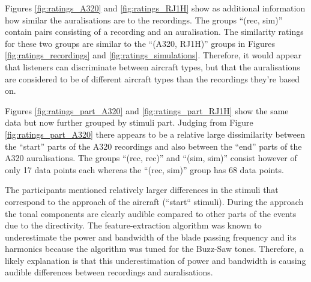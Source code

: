 
Figures \ref{fig:ratings_A320} and \ref{fig:ratings_RJ1H} show
as additional information how similar the auralisations are to the recordings.
The groups ``(rec, sim)'' contain pairs consisting of a recording and an
auralisation. The similarity ratings for these two groups are similar to the
``(A320, RJ1H)'' groups in Figures \ref{fig:ratings_recordings} and
\ref{fig:ratings_simulations}. Therefore, it would appear that listeners can
discriminate between aircraft types, but that the auralisations are considered
to be of different aircraft types than the recordings they're based on.

Figures \ref{fig:ratings_part_A320} and \ref{fig:ratings_part_RJ1H} show the
same data but now further grouped by stimuli part. Judging from Figure
\ref{fig:ratings_part_A320} there appears to be a relative large dissimilarity
between the ``start'' parts of the A320 recordings and also between the ``end''
parts of the A320 auralisations. The groups ``(rec, rec)'' and ``(sim, sim)''
consist however of only 17 data points each whereas the ``(rec, sim)'' group
has 68 data points.

The participants mentioned relatively larger differences in the stimuli that
correspond to the approach of the aircraft (``start`` stimuli). During the
approach the tonal components are clearly audible compared to other parts of the
events due to the directivity. The feature-extraction algorithm was known to
underestimate the power and bandwidth of the blade passing frequency and its
harmonics because the algorithm was tuned for the Buzz-Saw tones. Therefore, a
likely explanation is that this underestimation of power and bandwidth is
causing audible differences between recordings and auralisations.
